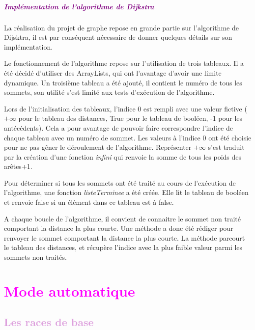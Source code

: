 \documentclass{report}
\begin{document}
      \paragraph{\textcolor{purple}{Implémentation de l'algorithme de Dijkstra}}
      La réalisation du projet de graphe repose en grande partie sur l'algorithme de Dijsktra, il est par conséquent nécessaire de donner quelques détails sur son implémentation.
       
      Le fonctionnement de l'algorithme repose sur l'utilisation de trois tableaux. Il a été décidé d'utiliser des ArrayLists, qui ont l'avantage d'avoir une limite dynamique. Un troisième tableau a été ajouté, il contient le numéro de tous les sommets, son utilité s'est limité aux tests d'exécution de l'algorithme.
      
      Lors de l'initialisation des tableaux, l'indice 0 est rempli avec une valeur fictive ($+\infty$ pour le tableau des distances, True pour le tableau de booléen, -1 pour les antécédents). Cela a pour avantage de pouvoir faire correspondre l'indice de chaque tableau avec un numéro de sommet. Les valeurs à l'indice 0 ont été choisie pour ne pas gêner le déroulement de l'algorithme. Représenter $+\infty$ s'est traduit par la création d'une fonction \emph{infini} qui renvoie la somme de tous les poids des arêtes+1.
      
      Pour déterminer si tous les sommets ont été traité au cours de l'exécution de l'algorithme, une fonction \emph{listeTerminee} a été créée. Elle lit le tableau de booléen et renvoie false si un élément dans ce tableau est à false.
       
		A chaque boucle de l'algorithme, il convient de connaitre le sommet non traité comportant la distance la plus courte. Une méthode a donc été rédiger pour renvoyer le sommet comportant la distance la plus courte. La méthode parcourt le tableau des distances, et récupère l'indice avec la plus faible valeur parmi les sommets non traités.	
			
			

	\chapter*{\textcolor{Fuchsia}{Mode automatique}}
		\section*{\textcolor{Plum}{Les races de base}}
\end{document}
